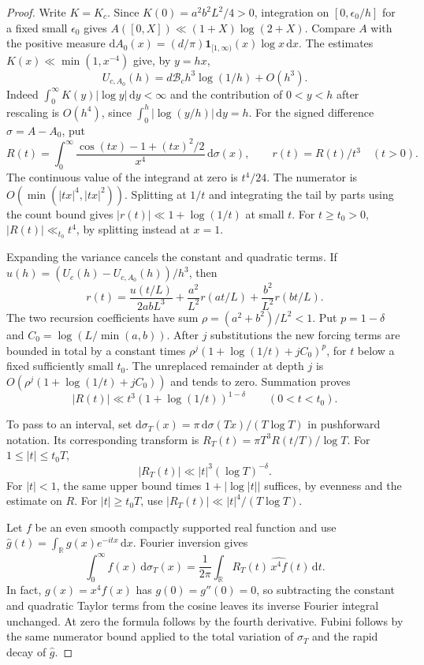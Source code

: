 \begin{proof}
Write $K=K_c$. Since $K(0)=a^2b^2L^2/4>0$, integration on
$[0,\epsilon_0/h]$ for a fixed small $\epsilon_0$ gives
$A([0,X])\ll (1+X)\log(2+X)$. Compare $A$ with the positive measure
$\mathrm dA_0(x)=(d/\pi)\mathbf1_{[1,\infty)}(x)\log x\,\mathrm dx$.
The estimates $K(x)\ll\min(1,x^{-4})$ give, by $y=hx$,
\[
 U_{c,A_0}(h)=d\mathcal B_c h^3\log(1/h)+O(h^3).
\]
Indeed $\int_0^\infty K(y)|\log y|\,\mathrm dy<\infty$ and the contribution of
$0<y<h$ after rescaling is $O(h^4)$, since
$\int_0^h|\log(y/h)|\,\mathrm dy=h$.
For the signed difference $\sigma=A-A_0$, put
\[
 R(t)=\int_0^\infty
       \frac{\cos(tx)-1+(tx)^2/2}{x^4}\,\mathrm d\sigma(x),
 \qquad r(t)=R(t)/t^3\quad(t>0).
\]
The continuous value of the integrand at zero is $t^4/24$.
The numerator is $O(\min(|tx|^4,|tx|^2))$. Splitting at $1/t$ and
integrating the tail by parts using the count bound gives
$|r(t)|\ll1+\log(1/t)$ at small $t$. For $t\ge t_0>0$,
$|R(t)|\ll_{t_0}t^4$, by splitting instead at $x=1$.

Expanding the variance cancels the constant and quadratic terms. If
$u(h)=(U_c(h)-U_{c,A_0}(h))/h^3$, then
\begin{equation}\label{eq:rate-contract}
 r(t)=\frac{u(t/L)}{2abL^3}
    +\frac{a^2}{L^2}r(at/L)+\frac{b^2}{L^2}r(bt/L).
\end{equation}
The two recursion coefficients have sum $\rho=(a^2+b^2)/L^2<1$.
Put $p=1-\delta$ and $C_0=\log(L/\min(a,b))$.
After $j$ substitutions the new forcing terms are bounded in total by
a constant times $\rho^j(1+\log(1/t)+j C_0)^p$, for $t$ below a fixed
sufficiently small $t_0$. The unreplaced remainder at depth $j$ is
$O(\rho^j(1+\log(1/t)+j C_0))$ and tends to zero. Summation proves
\[
 |R(t)|\ll t^3(1+\log(1/t))^{1-\delta}\qquad(0<t<t_0).
\]

To pass to an interval, set
$\mathrm d\sigma_T(x)=\pi\,\mathrm d\sigma(Tx)/(T\log T)$ in pushforward
notation. Its corresponding transform is
$R_T(t)=\pi T^3R(t/T)/\log T$. For $1\le |t|\le t_0T$,
\[
 |R_T(t)|\ll |t|^3(\log T)^{-\delta}.
\]
For $|t|<1$, the same upper bound times
$1+|\log|t||$ suffices, by evenness and the estimate on $R$. For
$|t|\ge t_0T$, use $|R_T(t)|\ll |t|^4/(T\log T)$.

Let $f$ be an even smooth compactly supported real function and use
$\widehat g(t)=\int_{\mathbb R}g(x)e^{-itx}\,\mathrm dx$. Fourier inversion gives
\begin{equation}\label{eq:rate-invert}
 \int_0^\infty f(x)\,\mathrm d\sigma_T(x)
 =\frac1{2\pi}\int_{\mathbb R} R_T(t)\,\widehat{x^4 f}(t)\,\mathrm dt .
\end{equation}
In fact, $g(x)=x^4 f(x)$ has $g(0)=g''(0)=0$, so subtracting the constant
and quadratic Taylor terms from the cosine leaves its inverse Fourier
integral unchanged. At zero the formula follows by the fourth derivative.
Fubini follows by the same numerator bound applied to the total variation
of $\sigma_T$ and the rapid decay of $\widehat g$.


\end{proof}
